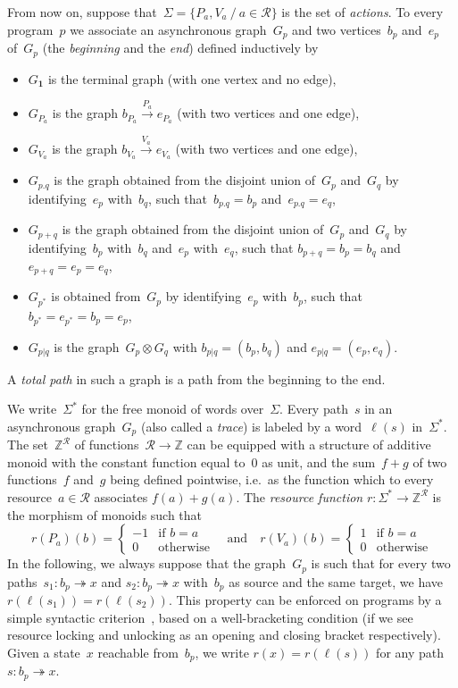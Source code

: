 \documentclass[orivec]{llncs} \usepackage[T1]{fontenc}
\newcommand{\resources}{\mathcal{R}}
\newcommand\set[1]{\{#1\}}
\newcommand\setof[2]{\set{#1\ /\ #2}}
\newcommand{\ie}{i.e.~}
\newcommand{\pone}{\mathbf{1}}
\renewcommand{\P}[1]{P_{#1}}
\newcommand{\V}[1]{V_{#1}}
\newcommand{\Z}{\mathbb{Z}}
\newcommand{\transition}[1]{\overset{#1}\to}
\newcommand{\transitionpath}[1]{\overset{#1}\twoheadrightarrow}
\newcommand{\lbl}[1]{\ell(#1)}
\begin{document}
{From now on, suppose that~$\Sigma=\setof{P_a,V_a}{a\in\resources}$ is the set of
\emph{actions}. To every program~$p$ we associate an asynchronous graph~$G_p$
and two vertices~$b_p$ and~$e_p$ of~$G_p$ (the \emph{beginning} and the
\emph{end}) defined inductively by
\begin{itemize}
\item $G_\pone$ is the terminal graph (with one vertex and no edge),
\item $G_{\P a}$ is the graph $b_{\P a}\transition{\P a}e_{\P a}$ (with two vertices
  and one edge),
\item $G_{\V a}$ is the graph $b_{\V a}\transition{\V a}e_{\V a}$ (with two
  vertices and one edge),
\item $G_{p.q}$ is the graph obtained from the disjoint union of~$G_p$ and~$G_q$
  by identifying~$e_p$ with~$b_q$, such that~$b_{p.q}=b_p$ and~$e_{p.q}=e_q$,
\item $G_{p+q}$ is the graph obtained from the disjoint union of~$G_p$ and~$G_q$
  by identifying~$b_p$ with~$b_q$ and~$e_p$ with~$e_q$, such
  that $b_{p+q}=b_p=b_q$ and~$e_{p+q}=e_p=e_q$,
\item $G_{p^*}$ is obtained from~$G_p$ by identifying~$e_p$ with~$b_p$, such
  that $b_{p^*}=e_{p^*}=b_p=e_p$,
\item $G_{p|q}$ is the graph~$G_p\otimes G_q$ with $b_{p|q}=(b_p,b_q)$
  and $e_{p|q}=(e_p,e_q)$.
\end{itemize}
A \emph{total path} in such a graph is a path from the beginning to the end.

We write~$\Sigma^*$ for the free monoid of words over~$\Sigma$. Every path~$s$
in an asynchronous graph~$G_p$ (also called a \emph{trace}) is labeled by a
word~$\lbl{s}$ in~$\Sigma^*$. The set~$\Z^\resources$ of
functions~$\resources\to\Z$ can be equipped with a structure of additive monoid
with the constant function equal to~$0$ as unit, and the sum~$f+g$ of two
functions~$f$ and~$g$ being defined pointwise, \ie as the function which to
every resource~$a\in\resources$ associates \hbox{$f(a)+g(a)$}. The
\emph{resource function} $r:\Sigma^*\to\Z^\resources$ is the morphism of monoids
such that
\[
r(\P a)(b)=
\begin{cases}
  -1&\text{if $b=a$}\\
  0&\text{otherwise}
\end{cases}
\quad\text{and}\quad
r(\V a)(b)=
\begin{cases}
  1&\text{if $b=a$}\\
  0&\text{otherwise}
\end{cases}
\]
In the following, we always suppose that the graph~$G_p$ is such that for every
two paths~$s_1:b_p\transitionpath{}x$ and \hbox{$s_2:b_p\transitionpath{}x$}
with~$b_p$ as source and the same target, we have
\hbox{$r(\lbl{s_1})=r(\lbl{s_2})$}. This property can be enforced on programs by
a simple syntactic criterion~\cite{fajstrup2000infinitely}, based on a
well-bracketing condition (if we see resource locking and unlocking as an
opening and closing bracket respectively). Given a state~$x$ reachable
from~$b_p$, we write \hbox{$r(x)=r(\lbl{s})$} for any path
\hbox{$s:b_p\transitionpath{}x$}.


}
\end{document}
